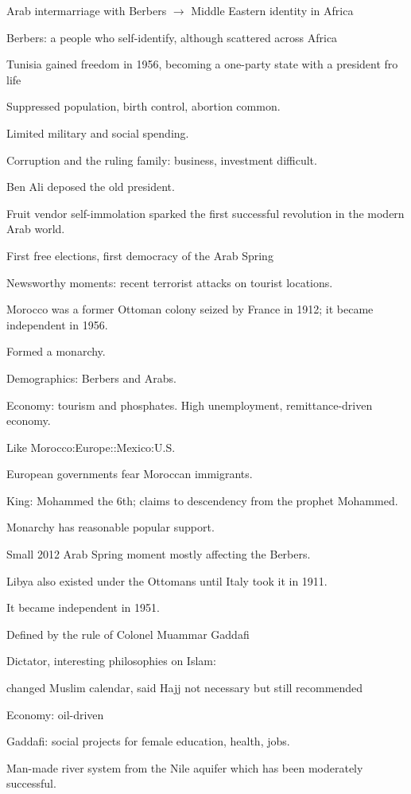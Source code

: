 \documentclass[12pt]{article}
\begin{document}
Arab intermarriage with Berbers $\to$ Middle Eastern identity in Africa

Berbers: a people who self-identify, although scattered across Africa

\noindent
Tunisia gained freedom in 1956, becoming a one-party state with a president fro life

Suppressed population, birth control, abortion common.

Limited military and social spending.

Corruption and the ruling family: business, investment difficult.

Ben Ali deposed the old president.

Fruit vendor self-immolation sparked the first successful revolution in the modern Arab world.

First free elections, first democracy of the Arab Spring

Newsworthy moments: recent terrorist attacks on tourist locations.

\noindent
Morocco was a former Ottoman colony seized by France in 1912; it became independent in 1956.

Formed a monarchy.

Demographics: Berbers and Arabs.

Economy: tourism and phosphates. High unemployment, remittance-driven economy.

Like Morocco:Europe::Mexico:U.S.

European governments fear Moroccan immigrants.

King: Mohammed the 6th; claims to descendency from the prophet Mohammed.

Monarchy has reasonable popular support.

Small 2012 Arab Spring moment mostly affecting the Berbers.

\noindent
Libya also existed under the Ottomans until Italy took it in 1911.

It became independent in 1951.

Defined by the rule of Colonel Muammar Gaddafi

Dictator, interesting philosophies on Islam:

changed Muslim calendar, said Hajj not necessary but still recommended

Economy: oil-driven

Gaddafi: social projects for female education, health, jobs.

Man-made river system from the Nile aquifer which has been moderately successful.
\end{document}
